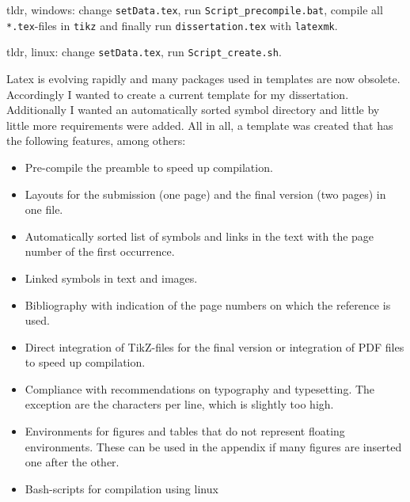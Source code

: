 
tldr, windows: change \texttt{setData.tex}, run \texttt{Script\_precompile.bat}, compile all \texttt{*.tex}-files in \texttt{tikz} and finally run \texttt{dissertation.tex} with \texttt{latexmk}.

tldr, linux: change \texttt{setData.tex}, run \texttt{Script\_create.sh}.

Latex is evolving rapidly and many packages used in templates are now obsolete. Accordingly I wanted to create a current template for my dissertation. Additionally I wanted an automatically sorted symbol directory and little by little more requirements were added. All in all, a template was created that has the following features, among others:

\begin{itemize}
	\item Pre-compile the preamble to speed up compilation.
	\item Layouts for the submission (one page) and the final version (two pages) in one file.
	\item Automatically sorted list of symbols and links in the text with the page number of the first occurrence.
	\item Linked symbols in text and images.
	\item Bibliography with indication of the page numbers on which the reference is used.
	\item Direct integration of TikZ-files for the final version or integration of PDF files to speed up compilation.
	\item Compliance with recommendations on typography and typesetting. The exception are the characters per line, which is slightly too high.
	\item Environments for figures and tables that do not represent floating environments. These can be used in the appendix if many figures are inserted one after the other.
	\item Bash-scripts for compilation using linux
\end{itemize}